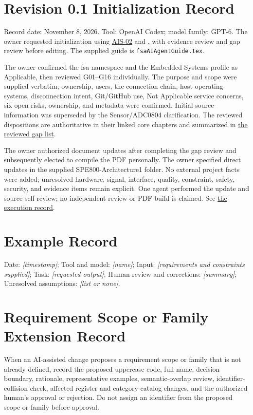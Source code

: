 \section{Revision 0.1 Initialization Record}
\label{Section:ProjectInitializationPromptLog}
Record date: November 8, 2026. Tool: OpenAI Codex; model family: GPT-6.
The owner requested initialization using \hyperref[Skill:AIS-02]{AIS-02} and
, with evidence review and gap review
before editing. The supplied guide is \texttt{fsaAIAgentGuide.tex}.

The owner confirmed the fsa namespace and the Embedded Systems profile as
Applicable, then reviewed G01--G16 individually. The purpose and scope were
supplied verbatim; ownership, users, the connection chain, host operating
systems, disconnection intent, Git/GitHub use, Not Applicable service concerns,
six open risks, \OwnedTBD{} ownership, and metadata were confirmed. Initial source-\OwnedTBD{}
information was superseded by the Sensor/ADC0804 clarification. The reviewed
dispositions are authoritative in their linked core chapters and summarized
in \hyperref[Table:ProjectGapReview]{the reviewed gap list}.

The owner authorized document updates after completing the gap review and
subsequently elected to compile the PDF personally. The owner specified direct
updates in the supplied SPE800-Architecture1 folder. No external project facts
were added; unresolved hardware, signal, interface, quality, constraint,
safety, security, and evidence items remain explicit. One agent performed
the update and source self-review; no independent review or PDF build is
claimed. See \hyperref[Section:ProjectExecutionRecord]{the execution record}.

\section{Example Record}
Date: \textit{[timestamp]}; Tool and model: \textit{[name]}; Input: \textit{[requirements and constraints supplied]}; Task: \textit{[requested output]}; Human review and corrections: \textit{[summary]}; Unresolved assumptions: \textit{[list or none]}.

\section{Requirement Scope or Family Extension Record}
When an AI-assisted change proposes a requirement scope or family that is not
already defined, record the proposed uppercase code, full name, decision
boundary, rationale, representative examples, semantic-overlap review,
identifier-collision check, affected register and category-catalog changes, and
the authorized human's approval or rejection. Do not assign an identifier from
the proposed scope or family before approval.
